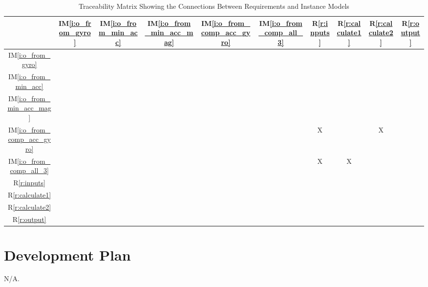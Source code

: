 \documentclass[12pt]{article}
\newcommand{\iref}[1]{IM\ref{#1}} \newcounter{reqnum} %
\newcommand{\rref}[1]{R\ref{#1}} \newcounter{nfrnum} %
\begin{document}
\begin{table}[h!]
\centering
\begin{tabular}{|c|c|c|c|c|c|c|c|c|c|}
\hline
	&\iref{i:o_from_gyro}         &\iref{i:o_from_min_acc}      &\iref{i:o_from_min_acc_mag}
	&\iref{i:o_from_comp_acc_gyro} &\iref{i:o_from_comp_all_3} & \rref{r:inputs}   &
	\rref{r:calculate1}  & \rref{r:calculate2}& \rref{r:output}    \\
\hline
\iref{i:o_from_gyro}         & & & & & & & & & \\ \hline
\iref{i:o_from_min_acc}      & & & & & & & & & \\ \hline
\iref{i:o_from_min_acc_mag}  & & & & & & & & & \\ \hline
\iref{i:o_from_comp_acc_gyro}& & & & & &X& &X& \\ \hline
\iref{i:o_from_comp_all_3}   & & & & & &X&X& & \\ \hline
\rref{r:inputs}              & & & & & & & & & \\ \hline
\rref{r:calculate1}          & & & & & & & & & \\ \hline
\rref{r:calculate2}          & & & & & & & & & \\ \hline
\rref{r:output}              & & & & & & & & & \\ \hline
\end{tabular}
\caption{Traceability Matrix Showing the Connections Between Requirements and Instance Models}
\label{Table:R_trace}
\end{table}


\section{Development Plan} \label{sec:dev_plan}

N/A.
\end{document}
